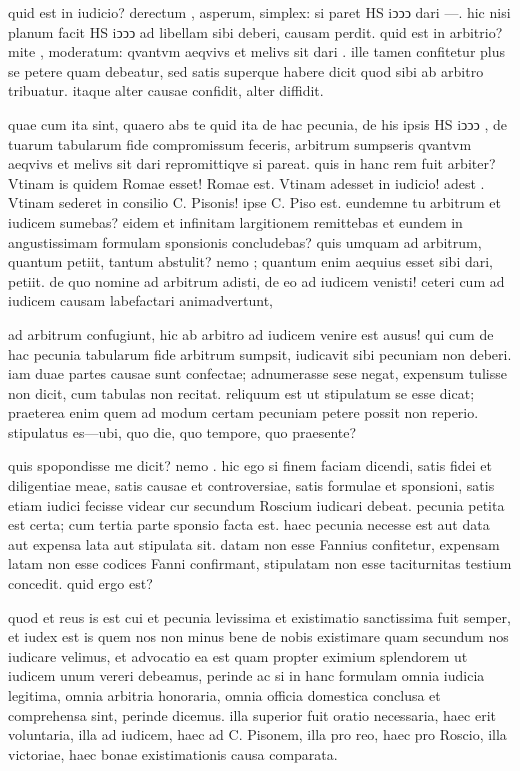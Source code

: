  quid est in iudicio? derectum , asperum, simplex: si paret HS iↄↄↄ dari —. hic nisi planum facit HS iↄↄↄ ad libellam sibi deberi, causam perdit. quid est in arbitrio? mite , moderatum: qvantvm aeqvivs et melivs sit dari . ille tamen confitetur plus se petere quam debeatur, sed satis superque habere dicit quod sibi ab arbitro tribuatur. itaque alter causae confidit, alter diffidit.

 quae cum ita sint, quaero abs te quid ita de hac pecunia, de his ipsis HS iↄↄↄ , de tuarum tabularum fide compromissum feceris, arbitrum sumpseris qvantvm aeqvivs et melivs sit dari repromittiqve si pareat. quis in hanc rem fuit arbiter? Vtinam is quidem Romae esset! Romae est. Vtinam adesset in iudicio! adest . Vtinam sederet in consilio C. Pisonis! ipse C. Piso est. eundemne tu arbitrum et iudicem sumebas? eidem et infinitam largitionem remittebas et eundem in angustissimam formulam sponsionis concludebas? quis umquam ad arbitrum, quantum petiit, tantum abstulit? nemo ; quantum enim aequius esset sibi dari, petiit. de quo nomine ad arbitrum adisti, de eo ad iudicem venisti! ceteri cum ad iudicem causam labefactari animadvertunt,

 ad arbitrum confugiunt, hic ab arbitro ad iudicem venire est ausus! qui cum de hac pecunia tabularum fide arbitrum sumpsit, iudicavit sibi pecuniam non deberi. iam duae partes causae sunt confectae; adnumerasse sese negat, expensum tulisse non dicit, cum tabulas non recitat. reliquum est ut stipulatum se esse dicat; praeterea enim quem ad modum certam pecuniam petere possit non reperio. stipulatus es—ubi, quo die, quo tempore, quo praesente?

 quis spopondisse me dicit? nemo . hic ego si finem faciam dicendi, satis fidei et diligentiae meae, satis causae et controversiae, satis formulae et sponsioni, satis etiam iudici fecisse videar cur secundum Roscium iudicari debeat. pecunia petita est certa; cum tertia parte sponsio facta est. haec pecunia necesse est aut data aut expensa lata aut stipulata sit. datam non esse Fannius confitetur, expensam latam non esse codices Fanni confirmant, stipulatam non esse taciturnitas testium concedit. quid ergo est?

 quod et reus is est cui et pecunia levissima et existimatio sanctissima fuit semper, et iudex est is quem nos non minus bene de nobis existimare quam secundum nos iudicare velimus, et advocatio ea est quam propter eximium splendorem ut iudicem unum vereri debeamus, perinde ac si in hanc formulam omnia iudicia legitima, omnia arbitria honoraria, omnia officia domestica conclusa et comprehensa sint, perinde dicemus. illa superior fuit oratio necessaria, haec erit voluntaria, illa ad iudicem, haec ad C. Pisonem, illa pro reo, haec pro Roscio, illa victoriae, haec bonae existimationis causa comparata.

